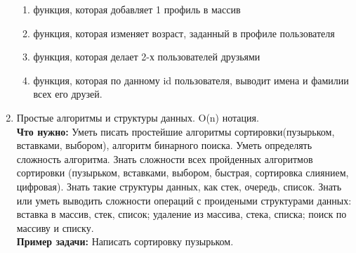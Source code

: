 \documentclass{article}
\begin{document}
\begin{enumerate}
\begin{enumerate}
\item функция, которая добавляет 1 профиль в массив
\item функция, которая изменяет возраст, заданный в профиле пользователя
\item функция, которая делает 2-х пользователей друзьями
\item функция, которая по данному id пользователя, выводит имена и фамилии всех его друзей.
\end{enumerate}
\item Простые алгоритмы и структуры данных. O(n) нотация. \\
\textbf{Что нужно:} Уметь писать простейшие алгоритмы сортировки(пузырьком, вставками, выбором), алгоритм бинарного поиска. Уметь определять сложность алгоритма. Знать сложности всех пройденных алгоритмов сортировки (пузырьком, вставками, выбором, быстрая, сортировка слиянием, цифровая). Знать такие структуры данных, как стек, очередь, список. Знать или уметь выводить сложности операций с проидеными структурами данных: вставка в массив, стек, список; удаление из массива, стека, списка; поиск по массиву и списку.\\
\textbf{Пример задачи:} Написать сортировку пузырьком.
\end{enumerate}
\end{document}
